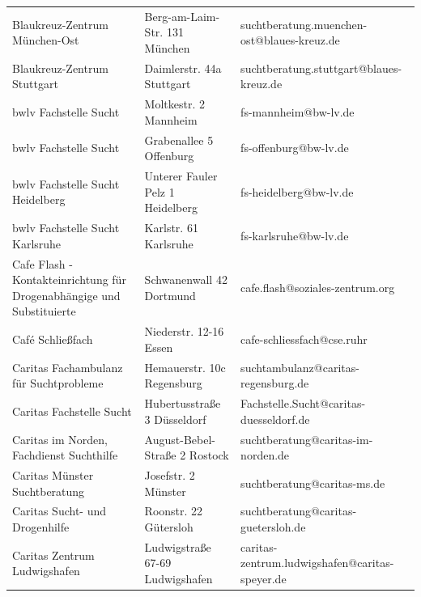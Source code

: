 {\begin{xltabular}{\textwidth} {
 >{\raggedright\arraybackslash}p{5cm}
 >{\raggedright\arraybackslash}X
 >{\raggedright\arraybackslash}p{5cm} }
Blaukreuz-Zentrum München-Ost & Berg-am-Laim-Str. 131 München & suchtberatung.muenchen-ost@blaues-kreuz.de \\
Blaukreuz-Zentrum Stuttgart & Daimlerstr. 44a Stuttgart & suchtberatung.stuttgart@blaues-kreuz.de \\
bwlv Fachstelle Sucht & Moltkestr. 2 Mannheim & fs-mannheim@bw-lv.de \\
bwlv Fachstelle Sucht & Grabenallee 5 Offenburg & fs-offenburg@bw-lv.de \\
bwlv Fachstelle Sucht Heidelberg & Unterer Fauler Pelz 1 Heidelberg & fs-heidelberg@bw-lv.de \\
bwlv Fachstelle Sucht Karlsruhe & Karlstr. 61 Karlsruhe & fs-karlsruhe@bw-lv.de \\
Cafe Flash - Kontakteinrichtung für Drogenabhängige und Substituierte & Schwanenwall 42 Dortmund & cafe.flash@soziales-zentrum.org \\
Café Schließfach & Niederstr. 12-16 Essen & cafe-schliessfach@cse.ruhr \\
Caritas Fachambulanz für Suchtprobleme & Hemauerstr. 10c Regensburg & suchtambulanz@caritas-regensburg.de \\
Caritas Fachstelle Sucht & Hubertusstraße 3 Düsseldorf & Fachstelle.Sucht@caritas-duesseldorf.de \\
Caritas im Norden, Fachdienst Suchthilfe & August-Bebel-Straße 2 Rostock & suchtberatung@caritas-im-norden.de \\
Caritas Münster Suchtberatung & Josefstr. 2 Münster & suchtberatung@caritas-ms.de \\
Caritas Sucht- und Drogenhilfe & Roonstr. 22 Gütersloh & suchtberatung@caritas-guetersloh.de \\
Caritas Zentrum Ludwigshafen & Ludwigstraße 67-69 Ludwigshafen & caritas-zentrum.ludwigshafen@caritas-speyer.de \\

\end{xltabular}}
